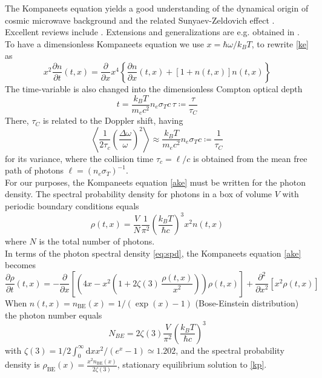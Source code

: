 \documentclass[a4paper,12pt,reqno,superscriptaddress,nofootinbib]{revtex4}
\theoremstyle{plain}
\theoremstyle{definition}
\theoremstyle{remark}
\newcommand{\id}{\textrm{d}}
\newcommand{\0}{^{(0)}}
\newcommand{\1}{^{(1)}}
\newcommand{\2}{^{(2)}}
\begin{document}
The Kompaneets equation yields a good understanding of the dynamical origin of cosmic microwave background and the related Sunyaev-Zeldovich effect \cite{sunyaeveffect,sunyaev}.  Excellent reviews include \cite{practical,gui,zeldovich}. Extensions and generalizations are e.g. obtained in \cite{buet, pitrou,barbosa, brown, itoh, itoh2, cooper, kohyama1, kohyama2, kohyama3,paper}.\\

To have a dimensionless Kompaneets equation we use $x= \hbar \omega/k_B T$, to rewrite \eqref{ke} as
\begin{equation}\label{ake}
x^2\frac{\partial n}{\partial t}(t,x) = \frac{\partial }{\partial x}x^4\left\{
\frac{\partial n}{\partial x}(t,x) + 
\left[1+n(t,x)\right]n(t,x)\right\}
\end{equation}
The time-variable is also changed into the dimensionless Compton optical depth
\[
t = \frac{ k_B T }{m_e c^2} n_e \sigma_T c \, \tau\coloneqq \frac{ \tau}{\tau_C}
\]
There, $\tau_C$ is related to the Doppler shift, having
\begin{equation}\label{shift}
\left\langle\frac{1}{2\tau_c}\left(\frac{\Delta\omega}{\omega}\right)^2\right\rangle\approx \frac{ k_B T }{m_e c^2} n_e \sigma_T c \coloneqq \frac{1}{\tau_C}
\end{equation} 
for its variance, where the collision time $\tau_c = \ell/c$ is obtained from the mean free path of photons $\ell=(n_e\sigma_T)^{-1}$.\\

For our purposes, the Kompaneets equation \eqref{ake} must be written for the photon density. The spectral probability density for photons in a box of volume $V$ with periodic boundary conditions equals
\begin{equation}\label{eq:spd}
\rho(t,x) = \frac{V}{N} \frac{1}{\pi^2} \left(\frac{k_B T}{\hbar c}\right)^3 
x^2 n(t,x)%
\end{equation}
where $N$ is the total number of photons.\\
In terms of the photon spectral density \eqref{eq:spd}, the Kompaneets equation \eqref{ake} becomes
\begin{equation}\label{kp}
\frac{\partial \rho}{\partial t} (t,x) = -\frac{\partial}{\partial x}\left[\left(4x- x^2\left(1+2\zeta(3) \,\frac{\rho(t,x)}{x^2}\right)\right)\rho(t,x)\right] + \frac{\partial^2}{\partial x^2}\left[x^2 \rho(t,x)\right]
\end{equation}
When $n(t,x)= n_\text{BE}(x) = 1 / (\exp(x) - 1)$ (Bose-Einstein distribution) the photon number 
equals
\[
N_{BE} = 2 \zeta(3) \frac{V}{\pi^2} \left( \frac{k_B T}{\hbar c} \right)^3
\]
with $\zeta(3) = 1/2 \int_0^\infty \id x x^2/(e^x-1) \simeq 1.202$, and the spectral probability density is $ \rho_\text{BE}(x) = \frac{x^2 n_\text{BE}(x)}{2\zeta(3)}$, stationary equilibrium solution to \eqref{kp}.
\end{document}
